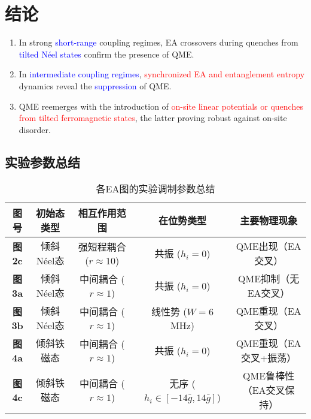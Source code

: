\documentclass[11pt,a4paper]{article}
\begin{document}
\section{结论}
\begin{enumerate}
    \item In strong \textcolor{blue}{short-range} coupling regimes, EA crossovers during quenches from \textcolor{blue}{tilted Néel states} confirm the presence of QME.
    \item In \textcolor{blue}{intermediate coupling regimes}, \textcolor{red}{synchronized EA and entanglement entropy} dynamics reveal the \textcolor{blue}{suppression} of QME.
    \item QME reemerges with the introduction of \textcolor{red}{on-site linear potentials or quenches from tilted ferromagnetic states}, the latter proving robust against on-site disorder.
\end{enumerate}


\subsection{实验参数总结}

\begin{table}[H]
\centering
\caption{各EA图的实验调制参数总结}
\begin{tabular}{|c|c|c|c|c|}
\hline
\textbf{图号} & \textbf{初始态类型} & \textbf{相互作用范围} & \textbf{在位势类型} & \textbf{主要物理现象} \\
\hline
\textbf{图2c} & 倾斜Néel态 & 强短程耦合 ($r \approx 10$) & 共振 ($h_i = 0$) & QME出现（EA交叉） \\
\hline
\textbf{图3a} & 倾斜Néel态 & 中间耦合 ($r \approx 1$) & 共振 ($h_i = 0$) & QME抑制（无EA交叉） \\
\hline
\textbf{图3b} & 倾斜Néel态 & 中间耦合 ($r \approx 1$) & 线性势 ($W = 6$ MHz) & QME重现（EA交叉） \\
\hline
\textbf{图4a} & 倾斜铁磁态 & 中间耦合 ($r \approx 1$) & 共振 ($h_i = 0$) & QME重现（EA交叉+振荡） \\
\hline
\textbf{图4c} & 倾斜铁磁态 & 中间耦合 ($r \approx 1$) & 无序 ($h_i \in [-14\bar{g},14\bar{g}]$) & QME鲁棒性（EA交叉保持） \\
\hline
\end{tabular}
\end{table}
\end{document}
